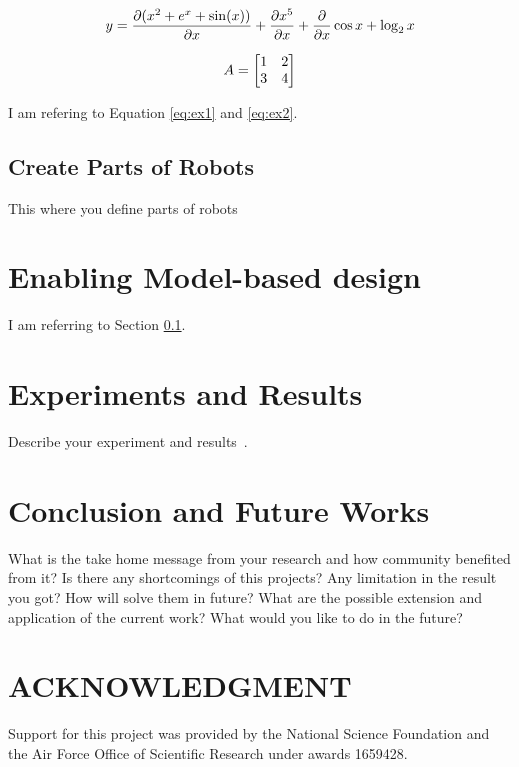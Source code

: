 \documentclass[letterpaper, 10 pt, conference]{ieeeconf}  %
\begin{document}

\begin{equation}
\label{eq:ex1}
	\begin{split}
	y = \pdv{(x^2 + e^x + \sin(x))}{x} + \pdv{x^5}{x} + \pdv{}{x}\cos x  + \log_2 x 
	\end{split}
\end{equation}

\begin{equation}
\label{eq:ex2}
A = \begin{bmatrix}1 & 2 \\ 3 & 4\end{bmatrix}
\end{equation}

I am refering to Equation \eqref{eq:ex1} and \eqref{eq:ex2}.




\subsection{Create Parts of Robots}
\label{sec:parts}
This where you define parts of robots~\cite{al2017technologies}

\section{Enabling Model-based design}
\label{sec:enablebd}
I am referring to Section \ref{sec:parts}.



\section{Experiments and Results}
\label{sec:experiments}

Describe your experiment and results~\cite{bhadani2018cat}.

    
   
\section{Conclusion and Future Works}
\label{sec:conclusion}
What is the take home message from your research and how community benefited from it? Is there any shortcomings of this projects? Any limitation in the result you got? 
How will solve them in future? What are the possible extension and application of the current work? What would you like to do in the future?


\section*{ACKNOWLEDGMENT}
Support for this project was provided by the National Science Foundation and the Air Force Office of Scientific Research under awards 1659428.




\end{document}
